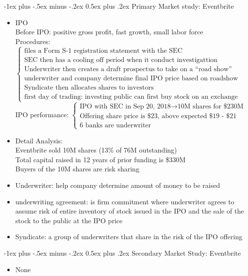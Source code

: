 \documentclass[10pt,landscape]{article}
\makeatletter
\renewcommand{\section}{\@startsection{section}{1}{0mm}%
                                {-1ex plus -.5ex minus -.2ex}%
                                {0.5ex plus .2ex}%
                                {\normalfont\large\bfseries}}
\makeatother
\begin{document}
\begin{multicols}{2}
\section{Primary Market study: Eventbrite}
\begin{itemize}
	\item IPO\\
		Before IPO: positive gross profit, fast growth, small labor force\\
		Procedures: $\begin{cases}
			\text{files a Form S-1 registration statement with the SEC}\\
			\text{SEC then has a cooling off period when it conduct investigattion}\\
			\text{Underwriter then creates a draft prospectus to take on a “road show”}\\
			\text{underwriter and company determine final IPO price based on roadshow}\\
			\text{Syndicate then allocates shares to investors}\\
			\text{first day of trading: investing public can first buy stock on an exchange}
		\end{cases}$\\
		IPO performance: $\begin{cases}
			\text{IPO with SEC in Sep 20, 2018} \longrightarrow \text{10M shares for \$230M}\\
			\text{Offering share price is \$23, above expected \$19 - \$21}\\
			\text{6 banks are underwriter}
		\end{cases}$
	\item Detail Analysis:\\
		Eventbrite sold 10M shares (13\% of 76M outstanding)\\
		Total capital raised in 12 years of prior funding is \$330M\\
		Buyers of the 10M shares are risk sharing
	\item Underwriter: help company determine amount of money to be raised
	\item underwriting agreement: is firm commitment where underwriter agrees to assume risk of entire inventory of stock issued in the IPO and the sale of the stock to the public at the IPO price
	\item Syndicate: a group of underwriters that share in the risk of the IPO offering
\end{itemize}

\section{Secondary Market Study: Eventbrite}
\begin{itemize}
	\item None
\end{itemize}


\end{multicols}
\end{document}
